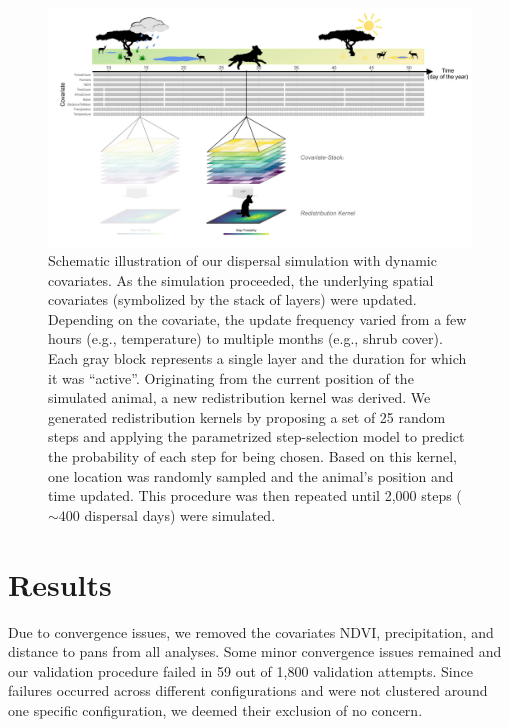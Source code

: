 \documentclass[../FinalThesis.tex]{subfiles}
\begin{document}
\begin{figure}[htpb]
 \begin{center}
  \includegraphics[width = \textwidth]{Figures/Schematic}
  \caption{Schematic illustration of our dispersal simulation with dynamic
  covariates. As the simulation proceeded, the underlying spatial covariates
  (symbolized by the stack of layers) were updated. Depending on the covariate,
  the update frequency varied from a few hours (e.g., temperature) to multiple
  months (e.g., shrub cover). Each gray block represents a single layer and the
  duration for which it was ``active''. Originating from the current position of
  the simulated animal, a new redistribution kernel was derived. We generated
  redistribution kernels by proposing a set of 25 random steps and applying the
  parametrized step-selection model to predict the probability of each step for
  being chosen. Based on this kernel, one location was randomly sampled and the
  animal's position and time updated. This procedure was then repeated until
  2,000 steps ($\sim 400$ dispersal days) were simulated.}
  \label{Schematic}
 \end{center}
\end{figure}

\section{Results}

Due to convergence issues, we removed the covariates NDVI, precipitation, and
distance to pans from all analyses. Some minor convergence issues remained and
our validation procedure failed in 59 out of 1,800 validation attempts. Since
failures occurred across different configurations and were not clustered around
one specific configuration, we deemed their exclusion of no concern.
\end{document}
